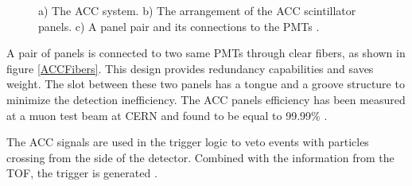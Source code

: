 \begin{figure}[h] 
\centering   
{}    
\caption[The ACC scintillator panels pair and PMTs.]{a) The ACC system. b) The arrangement of the ACC scintillator panels. c) A panel pair and its connections to the PMTs \cite{ACCDetector}.}
\end{figure}

A pair of panels is connected to two same PMTs through clear fibers, as shown in figure \ref{ACCFibers}. This design provides redundancy capabilities and saves weight. The slot between these two panels has a tongue and a groove structure to minimize the detection inefficiency. The ACC panels efficiency has been measured at a muon test beam at CERN and found to be equal to 99.99\% \cite{AMSWebside}. \par

The ACC signals are used in the trigger logic to veto events with particles crossing from the side of the detector. Combined with the information from the TOF, the trigger is generated \cite{ACCAsTrigger}. 



